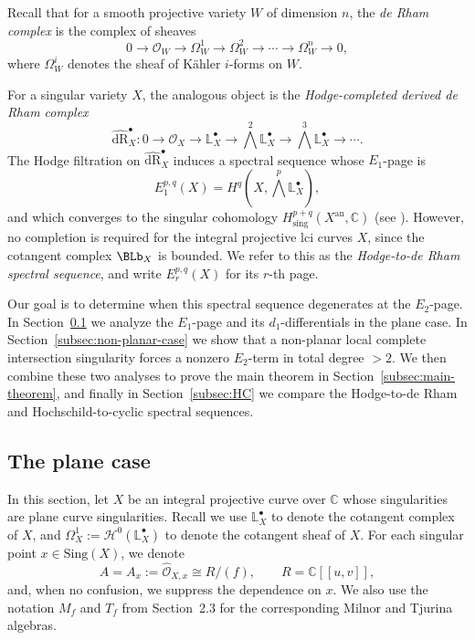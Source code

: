 \documentclass[12pt,reqno]{amsart}
\begin{document}
Recall that for a smooth projective variety \(W\) of dimension \(n\), the \emph{de Rham complex} is the complex of sheaves
\[
0 \to \mathcal O_W \to \Omega_W^1 \to \Omega_W^2 \to \cdots \to \Omega_W^n \to 0,
\]
where \(\Omega_W^i\) denotes the sheaf of K\"ahler \(i\)-forms on \(W\).

For a singular variety \(X\), the analogous object is the \emph{Hodge-completed derived de Rham complex}
\[
\widehat{\mathrm{dR}}_X^{\bullet} : 0 \to \mathcal O_X \to \mathbb{L}^{\bullet}_X \to \bigwedge^2 \mathbb{L}^{\bullet}_X \to \bigwedge^3 \mathbb{L}^{\bullet}_X \to \cdots.
\]
The Hodge filtration on \( \widehat{\mathrm{dR}}_X^{\bullet} \) induces a spectral sequence whose \(E_1\)-page is
\[
E_1^{p,q}(X)
   = H^{q}\!\left(X, \bigwedge^{p}\mathbb{L}^{\bullet}_X\right),
\]
and which converges to the singular cohomology \(H^{p+q}_{\mathrm{sing}}(X^{\mathrm{an}},\mathbb C)\) (see \cite[\S~5]{Bhatt_12}). However, no completion is required for the integral projective lci curves \(X\), since the cotangent complex \(\BLb_X\) is bounded. We refer to this as the \emph{Hodge-to-de Rham spectral sequence}, and write \(E_r^{p,q}(X)\) for its \(r\)-th page.

Our goal is to determine when this spectral sequence degenerates at the \(E_2\)-page. In Section~\ref{subsec:plane-case} we analyze the \(E_1\)-page and its \(d_1\)-differentials in the plane case. In Section~\ref{subsec:non-planar-case} we show that a non-planar local complete intersection singularity forces a nonzero \(E_2\)-term in total degree \(>2\). We then combine these two analyses to prove the main theorem in Section~\ref{subsec:main-theorem}, and finally in Section~\ref{subsec:HC} we compare the Hodge-to-de Rham and Hochschild-to-cyclic spectral sequences.


\subsection{The plane case}\label{subsec:plane-case}

In this section, let \(X\) be an integral projective curve over \(\mathbb{C}\) whose singularities are plane curve singularities. Recall we use \(\mathbb{L}^{\bullet}_X\) to denote the cotangent complex of \(X\), and \(\Omega_X^1:=\mathcal{H}^0(\mathbb{L}^{\bullet}_X)\) to denote the cotangent sheaf of \(X\). For each singular point \(x\in \mathrm{Sing}(X)\), we denote
\[
A=A_x:=\widehat{\mathcal O}_{X,x}\cong R/(f),
\qquad
R=\mathbb C[[u,v]],
\]
and, when no confusion, we suppress the dependence on \(x\). We also use the notation \(M_f\) and \(T_f\) from Section~2.3 for the corresponding Milnor and Tjurina algebras.
\end{document}
